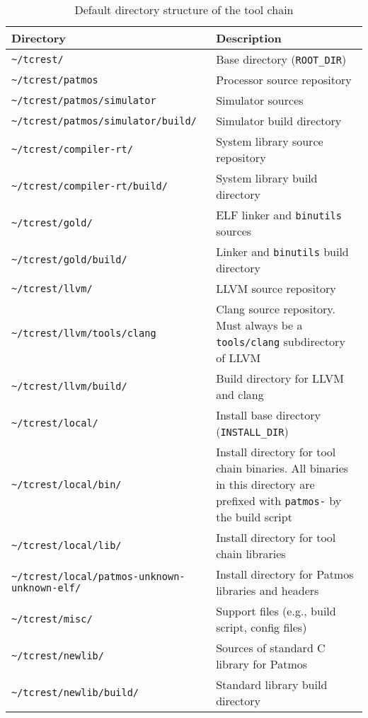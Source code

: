 \newcommand{\rootdir}[1]{\texttt{\textasciitilde/tcrest/#1}}
\newcommand{\myspace}{2mm}
\begin{table}
\centering
\begin{tabularx}{\textwidth}{lX}
Directory & Description \\ \hline
\rootdir{} & Base directory (\texttt{ROOT\_DIR}) \\ [\myspace]
\rootdir{patmos} &  Processor source repository \\ [\myspace]
\rootdir{patmos/simulator} & Simulator sources \\ [\myspace]
\rootdir{patmos/simulator/build/} & Simulator build directory \\ [\myspace]
\rootdir{compiler-rt/} & System library source repository  \\ [\myspace]
\rootdir{compiler-rt/build/} & System library build directory \\ [\myspace]
\rootdir{gold/} & ELF linker and \texttt{binutils} sources \\ [\myspace] 
\rootdir{gold/build/} & Linker and \texttt{binutils} build directory \\ [\myspace]
\rootdir{llvm/} & LLVM source repository \\ [\myspace] 
\rootdir{llvm/tools/clang} & Clang source repository. Must always be a 
			    \texttt{tools/clang} subdirectory of LLVM \\ [\myspace]
\rootdir{llvm/build/} & Build directory for LLVM and clang \\ [\myspace] 
\rootdir{local/} & Install base directory (\texttt{INSTALL\_DIR}) \\ [\myspace]
\rootdir{local/bin/} & Install directory for tool chain binaries. 
                       All binaries in this directory are prefixed 
		       with \texttt{patmos-} by the build script \\ [\myspace]
\rootdir{local/lib/} & Install directory for tool chain libraries \\ [\myspace] 
\rootdir{local/patmos-unknown-unknown-elf/} & Install directory for Patmos 
                                       libraries and headers \\ [\myspace]
\rootdir{misc/} & Support files (e.g., build script, config files) \\ [\myspace]
\rootdir{newlib/} & Sources of standard C library for Patmos \\ [\myspace]
\rootdir{newlib/build/} & Standard library build directory 
\end{tabularx}
\caption{Default directory structure of the tool chain}
\label{tab:directories}
\end{table}

